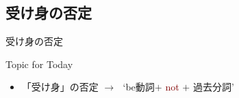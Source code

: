 \documentclass[aspectratio=169,xcolor={dvipsnames,table}]{beamer}
\newcommand{\myaudio}[1]{\href{#1}{\faVolumeUp}}
\begin{document}
\subsection{受け身の否定}
\begin{frame}[plain]{受け身の否定}
\Large

\hfill{}


\vfill

\hfill\myaudio{./audio/051_passive_06.mp3}

\begin{exampleblock}{Topic for Today}
\begin{itemize}[square]\small
 \item 「受け身」の否定 $\longrightarrow$\,\,\,\,`be動詞$+$ \textcolor{Maroon}{not} $+$ 過去分詞'
\end{itemize}
     \end{exampleblock}

\end{frame}
\end{document}
